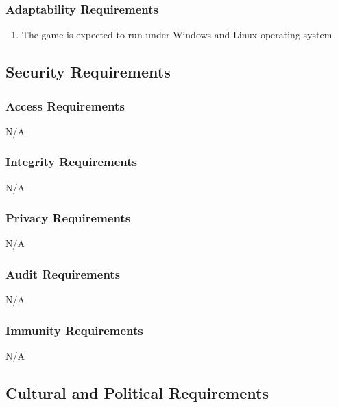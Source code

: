 \documentclass[12pt, titlepage]{article}
\begin{document}
\subsubsection{Adaptability Requirements}
\label{ssub:adaptability_requirements}
\begin{enumerate}[start=8,label={ MS\arabic*.} ]
        \item The game is expected to run under Windows and Linux operating system
\end{enumerate}


\subsection{Security Requirements}
\label{sub:security_requirements}

\subsubsection{Access Requirements}
\label{ssub:access_requirements}
N/A

\subsubsection{Integrity Requirements}
\label{ssub:integrity_requirements}
N/A

\subsubsection{Privacy Requirements}
\label{ssub:privacy_requirements}
N/A

\subsubsection{Audit Requirements}
\label{ssub:audit_requirements}
N/A

\subsubsection{Immunity Requirements}
\label{ssub:immunity_requirements}
N/A


\subsection{Cultural and Political Requirements}
\label{sub:cultural_and_political_requirements}
\end{document}
